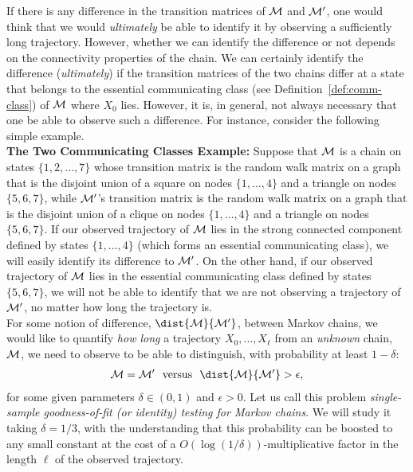 \noindent If there is any difference in the transition matrices of $\cal M$ and $\cal M'$, one would think that we would {\em ultimately} be able to identify it by observing a sufficiently long trajectory. However, whether we can identify the difference or not depends on the connectivity properties of the chain. We can certainly identify the difference ({\em ultimately}) if the transition matrices of the two chains differ at a state that belongs to the essential communicating class (see Definition~\ref{def:comm-class}) of $\cal M$ where $X_0$ lies. However, it is, in general, not always necessary that one be able to observe such a difference. For instance, consider the following simple example. \\

\noindent \textbf{The Two Communicating Classes Example:} Suppose that $\cal M$ is a chain on states $\{1,2,\ldots,7\}$ whose transition matrix is the random walk matrix on a graph that is the disjoint union of a square on nodes $\{1,\ldots,4\}$ and a triangle on nodes $\{5,6,7\}$, while $\cal M'$'s transition matrix is the random walk matrix on a graph that is the disjoint union of a clique on nodes $\{1,\ldots,4\}$ and a triangle on nodes $\{5,6,7\}$. If our observed trajectory of $\cal M$ lies in the strong connected component defined by states $\{1,\ldots,4\}$ (which forms an essential communicating class), we will easily identify its difference to $\cal M'$. On the other hand, if our observed trajectory of $\cal M$ lies in the essential communicating class defined by states $\{5,6,7\}$, we will not be able to identify that we are not observing a trajectory of $\cal M'$, no matter how long the trajectory is.\\




For some notion of difference, $\dist{\cal M}{\cal M'}$, between Markov chains, we would like to quantify {\em how long} a trajectory $X_0,\ldots,X_{\ell}$ from an {\em unknown} chain, $\cal M$, we need to observe to be able to distinguish, with probability at least $1-\delta$:
\begin{align}
{\cal M}={\cal M}'~~\text{versus}~~\dist{\cal M}{\cal M'}>\epsilon, \label{eq:gof MC testing}
\end{align}
for some given parameters $\delta \in (0,1)$ and $\epsilon>0$. Let us call this problem {\em single-sample goodness-of-fit (or identity) testing for Markov chains}. We will study it taking $\delta=1/3$, with the understanding that this probability can be boosted to any small constant at the cost of a $O(\log (1/\delta))$-multiplicative factor in the length $\ell$ of the observed trajectory.

